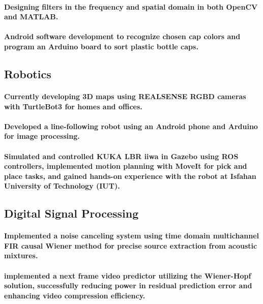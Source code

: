 \documentclass[a4paper]{article}
\begin{document}
\paragraph{Designing filters in the frequency and spatial domain in both OpenCV and MATLAB.}
\paragraph{Android software development to recognize chosen cap colors and program an Arduino board to sort plastic bottle caps.}

\subsection{Robotics}
            
\paragraph{Currently developing 3D maps using REALSENSE RGBD cameras with TurtleBot3 for homes and offices.}
\paragraph{Developed a line-following robot using an Android phone and Arduino for image processing.}
\paragraph{Simulated and controlled KUKA LBR iiwa in Gazebo using ROS controllers, implemented motion planning with MoveIt for pick and place tasks, and gained hands-on experience with the robot at Isfahan University of Technology (IUT).}
\subsection{Digital Signal Processing}
\paragraph{Implemented a noise canceling system using time domain multichannel FIR causal Wiener method for precise source extraction from acoustic mixtures.}
\paragraph{implemented a next frame video predictor utilizing the Wiener-Hopf solution, successfully reducing power in residual prediction error and enhancing video compression efficiency.}
\end{document}
